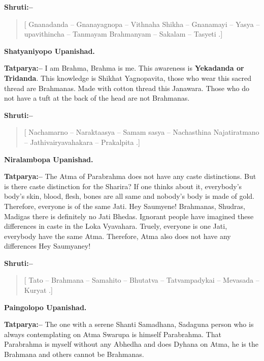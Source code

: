 \textbf{Shruti:–}

\begin{verse}
[ Gnanadanda – Gnanayagnopa – Vithnaha  Shikha – Gnanamayi – Yasya – upavithincha – Tanmayam  Brahmanyam – Sakalam – Tasyeti .]
\end{verse}

\begin{flushright}
\textbf{Shatyaniyopo Upanishad.}
\end{flushright}

\textbf{Tatparya:–} I am Brahma, Brahma is me. This awareness is \textbf{Yekadanda or Tridanda}. This knowledge is Shikhat Yagnopavita, those who wear this sacred thread are Brahmanas. Made with cotton thread this Janawara. Those who do not have a tuft at the back of the head are not Brahmanas.

\textbf{Shruti:–}

\begin{verse}
[ Nachamarno – Naraktaasya – Samam sasya – Nachasthina  Najatiratmano – Jathivairyavahakara – Prakalpita .]
\end{verse}

\begin{flushright}
\textbf{Niralambopa Upanishad.}
\end{flushright}

\textbf{Tatparya:–} The Atma of Parabrahma does not have any caste distinctions. But is there caste distinction for the Sharira? If one thinks about it, everybody's body's skin, blood, flesh, bones are all same and nobody's body is made of gold. Therefore, everyone is of the same Jati. Hey Saumyene! Brahmanas, Shudras, Madigas there is definitely no Jati Bhedas. Ignorant people have imagined these differences in caste in the Loka Vyavahara. Truely, everyone is one Jati, everybody have the same Atma. Therefore, Atma also does not have any differences Hey Saumyaney!

\textbf{Shruti:–}

\begin{verse}
[ Tato – Brahmana – Samahito – Bhutatva – Tatvampadykai – Mevasada – Kuryat .]
\end{verse}

\begin{flushright}
\textbf{Paingolopo Upanishad.}
\end{flushright}

\textbf{Tatparya:–} The one with a serene Shanti Samadhana, Sadaguna person who is always contemplating on Atma Swarupa is himself Parabrahma. That Parabrahma is myself without any Abhedha and does Dyhana on Atma, he is the Brahmana and others cannot be Brahmanas.

